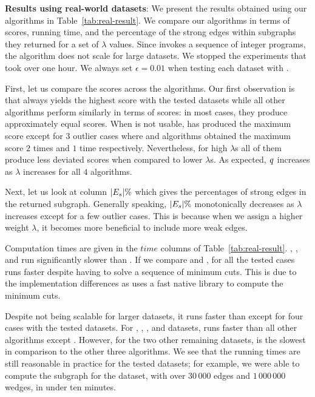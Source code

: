 \textbf{Results using real-world datasets}:
We present the results obtained using our algorithms in Table~\ref{tab:real-result}. We compare our algorithms in terms of scores, running time, and the percentage of the strong edges within
subgraphs they returned for a set of $\lambda$ values.
Since \algip invokes a sequence of integer programs, the algorithm does not scale for large datasets. 
We stopped the experiments that took over one hour. 
We always set $\epsilon = 0.01$ when testing each dataset with \algip.

First, let us compare the scores across the algorithms.
Our first observation is that \algip always yields the highest score with the tested datasets while all other algorithms perform similarly in terms of scores: in most cases, they produce approximately equal scores.
When \algip is not usable, \alglpstc has produced the maximum score except for $3$ outlier cases where \alggreedyfastest and \algdensec algorithms obtained the maximum score  $2$ times and $1$ time respectively. Nevertheless, for high $\lambda$s all of them produce less deviated scores when compared to lower $\lambda$s.
As expected, $\score{}$ increases as $\lambda$ increases for all $4$ algorithms. 

Next, let us look at column ${\left|E_s\right|} \%$ which gives the percentages of strong edges in the returned subgraph.
Generally speaking, ${\left|E_s\right|}\%$ monotonically decreases as $\lambda$ increases except for a few outlier cases. This is because when we assign a higher weight $\lambda$, it becomes more beneficial to include more weak edges.

Computation times are given in the $time$ columns of Table~\ref{tab:real-result}. 
\alggreedyfastest, \alglpstc, and \algdenseg run significantly slower than \algdensec.  
If we compare \alggreedyfastest and \algdenseg, for all the tested cases \algdenseg runs faster despite having to solve a sequence of minimum cuts. This is due to the implementation differences as \algdenseg uses a fast native library to compute the minimum cuts.

Despite \algip not being scalable for larger datasets, it runs faster than \alggreedyfastest except for four cases with the tested datasets.
For , , , and   datasets, \alglpstc runs faster than all other algorithms except \algdensec.  However, for the two other remaining datasets, 
\alglpstc is the slowest in comparison to the other three algorithms.
We see that the running times are still reasonable in practice for the tested datasets; for example, we were able to compute the subgraph for the 
dataset, with over $30\,000$ edges and $1\, 000 \,000$ wedges, in under ten minutes.

